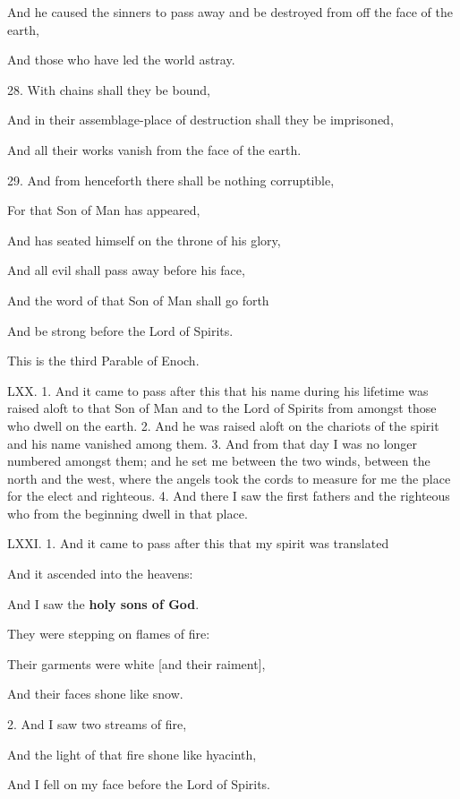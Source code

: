 And he caused the sinners to pass away and be destroyed from off the face of the earth,

And those who have led the world astray.

28. With chains shall they be bound,

And in their assemblage-place of destruction shall they be imprisoned,

And all their works vanish from the face of the earth.

29. And from henceforth there shall be nothing corruptible,

For that Son of Man has appeared,

And has seated himself on the throne of his glory,

And all evil shall pass away before his face,

And the word of that Son of Man shall go forth

And be strong before the Lord of Spirits.

This is the third Parable of Enoch.


LXX. 1. And it came to pass after this that his
name during his lifetime was raised aloft to that Son
of Man and to the Lord of Spirits from amongst those
who dwell on the earth. 2. And he was raised aloft
on the chariots of the spirit and his name vanished
among them. 3. And from that day I was no longer
numbered amongst them; and he set me between
the two winds, between the north and the west,
where the angels took the cords to measure for me
the place for the elect and righteous. 4. And there
I saw the first fathers and the righteous who from the
beginning dwell in that place.


LXXI. 1. And it came to pass after this that my spirit was translated

And it ascended into the heavens:

And I saw the \textbf{holy sons of God}.

They were stepping on flames of fire:

Their garments were white [and their raiment],

And their faces shone like snow.

2. And I saw two streams of fire,

And the light of that fire shone like hyacinth,

And I fell on my face before the Lord of Spirits.

